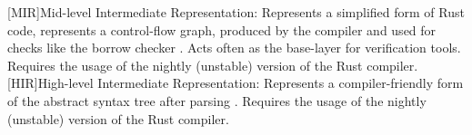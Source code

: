 \begin{acronym}[MIR] 
[MIR]{Mid-level Intermediate Representation: Represents a simplified form of Rust code, represents a control-flow graph, produced by the compiler and used for checks like the borrow checker \cite{rust_foundation_mir_nodate}. Acts often as the base-layer for verification tools. Requires the usage of the nightly (unstable) version of the Rust compiler.}
[HIR]{High-level Intermediate Representation: Represents a compiler-friendly form of the abstract syntax tree after parsing \cite{rust_foundation_hir_2023}. Requires the usage of the nightly (unstable) version of the Rust compiler.}
\end{acronym}